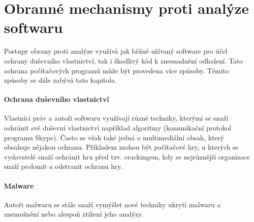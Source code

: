 \section{Obranné mechanismy proti analýze softwaru}

Postupy obrany proti analýze využívá jak běžně užívaný software pro účel ochrany duševního vlastnictví, tak i škodlivý kód k znesnadnění odhalení. Tato ochrana počítačových programů může být provedena více způsoby. Těmito způsoby se dále zabývá tato kapitola.


\paragraph*{Ochrana duševního vlastnictví}
Vlastníci práv a autoři softwaru využívají různé techniky, kterými se snaží ochránit své duševní vlastnictví například algoritmy (komunikační protokol programu Skype). Často se však také jedná o multimediální obsah, který obsahuje nějakou ochranu. Příkladem mohou být počítačové hry, u kterých se vydavatelé snaží ochránit hru před tzv. crackingem, kdy se nejrůznější organizace snaží prolomit a odstranit ochranu hry. 


\paragraph*{Malware}

Autoři malwaru se stále snaží vymýšlet nové techniky ukrytí malwaru a znemožnění nebo alespoň ztížení jeho analýzy. 





